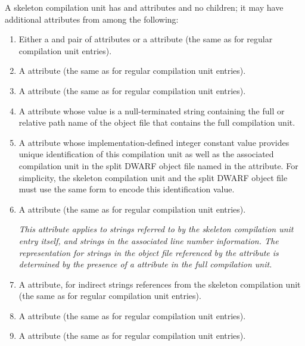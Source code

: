 A skeleton compilation unit has \DWATdwoname{} and 
\DWATdwoid{} attributes and no children; it may have additional
attributes from among the following:
\begin{enumerate}[1. ]

\item
Either a \DWATlowpc{} and \DWAThighpc{} pair of attributes
or a \DWATranges{} attribute (the same as for regular
compilation unit entries).

\item
A \DWATstmtlist{} attribute (the same as for regular
compilation unit entries).

\item
A \DWATcompdir{} attribute (the same as for regular
compilation unit entries).

\item
{}
A \DWATdwonameDEFN{} attribute
whose value is a
null-terminated string containing the full or relative
path name of the object file that contains the full
compilation unit.

\item
{}
A \DWATdwoidDEFN{} attribute
whose implementation-defined integer constant value
provides unique identification of this compilation unit
as well as the associated compilation unit in the
split DWARF object file named in the \DWATdwoname{}
attribute. For simplicity, the skeleton compilation
unit and the split DWARF object file must use the same
form to encode this identification value.

\item
A \DWATuseUTFeight{} attribute (the same as for regular compilation unit
entries).

\textit{This attribute applies to strings referred to by the skeleton
compilation unit entry itself, and strings in the associated line
number information.
The representation for strings in the object file referenced 
by the \DWATdwoname{} attribute is determined by the presence 
of a \DWATuseUTFeight{} attribute in the full compilation unit.}

\item
A \DWATstroffsetsbase{} attribute, for indirect strings references 
from the skeleton compilation unit (the same as for regular 
compilation unit entries).

\item
A \DWATaddrbase{} attribute (the same as for regular
compilation unit entries).

\item
A \DWATrangesbase{} attribute (the same as for regular
compilation unit entries).

\end{enumerate}

